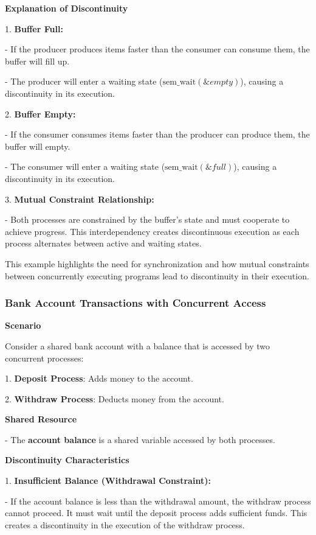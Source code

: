 \documentclass[a4paper]{book}
\begin{document}
\textbf{Explanation of Discontinuity}

1. \textbf{Buffer Full:}

   - If the producer produces items faster than the consumer can consume them, the buffer will fill up.
   
   - The producer will enter a waiting state ($\mathrm{sem\_wait}(\&empty)$), causing a discontinuity in its execution.

2. \textbf{Buffer Empty:}

   - If the consumer consumes items faster than the producer can produce them, the buffer will empty.
   
   - The consumer will enter a waiting state ($\mathrm{sem\_wait}(\&full)$), causing a discontinuity in its execution.

3. \textbf{Mutual Constraint Relationship:}

   - Both processes are constrained by the buffer’s state and must cooperate to achieve progress. This interdependency creates discontinuous execution as each process alternates between active and waiting states.

This example highlights the need for synchronization and how mutual constraints between concurrently executing programs lead to discontinuity in their execution.

\subsubsection{Bank Account Transactions with Concurrent Access}

\textbf{Scenario}

Consider a shared bank account with a balance that is accessed by two concurrent processes:

1. \textbf{Deposit Process}: Adds money to the account.

2. \textbf{Withdraw Process}: Deducts money from the account.

\textbf{Shared Resource}

- The \textbf{account balance} is a shared variable accessed by both processes.

\textbf{Discontinuity Characteristics}

1. \textbf{Insufficient Balance (Withdrawal Constraint):}

   - If the account balance is less than the withdrawal amount, the withdraw process cannot proceed. It must wait until the deposit process adds sufficient funds. This creates a discontinuity in the execution of the withdraw process.
\end{document}
